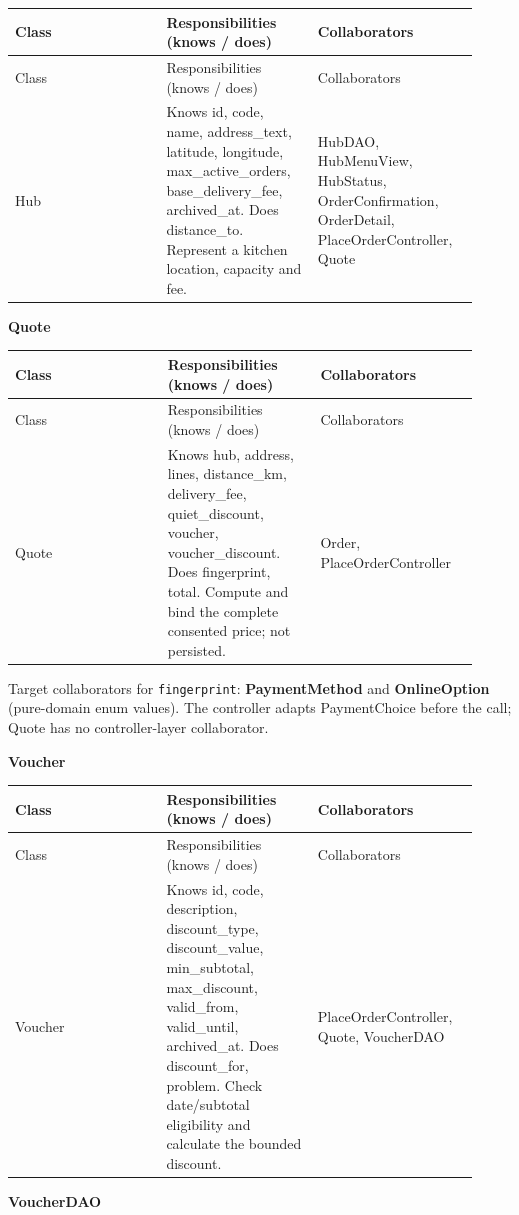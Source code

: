 \begin{longtable}{>{\raggedright\arraybackslash}p{0.3067\linewidth}>{\raggedright\arraybackslash}p{0.3067\linewidth}>{\raggedright\arraybackslash}p{0.3067\linewidth}}
Class & Responsibilities (knows / does) & Collaborators \\
\hline\endfirsthead
Class & Responsibilities (knows / does) & Collaborators \\
\hline\endhead
Hub & Knows id, code, name, address\_text, latitude, longitude, max\_active\_orders, base\_delivery\_fee, archived\_at. Does distance\_to. Represent a kitchen location, capacity and fee. & HubDAO, HubMenuView, HubStatus, OrderConfirmation, OrderDetail, PlaceOrderController, Quote \\
\end{longtable}
\textbf{Quote}

\begin{longtable}{>{\raggedright\arraybackslash}p{0.3067\linewidth}>{\raggedright\arraybackslash}p{0.3067\linewidth}>{\raggedright\arraybackslash}p{0.3067\linewidth}}
Class & Responsibilities (knows / does) & Collaborators \\
\hline\endfirsthead
Class & Responsibilities (knows / does) & Collaborators \\
\hline\endhead
Quote & Knows hub, address, lines, distance\_km, delivery\_fee, quiet\_discount, voucher, voucher\_discount. Does fingerprint, total. Compute and bind the complete consented price; not persisted. & Order, PlaceOrderController \\
\end{longtable}
Target collaborators for \texttt{fingerprint}: \textbf{PaymentMethod} and \textbf{OnlineOption} (pure-domain enum values). The controller adapts PaymentChoice before the call; Quote has no controller-layer collaborator.

\textbf{Voucher}

\begin{longtable}{>{\raggedright\arraybackslash}p{0.3067\linewidth}>{\raggedright\arraybackslash}p{0.3067\linewidth}>{\raggedright\arraybackslash}p{0.3067\linewidth}}
Class & Responsibilities (knows / does) & Collaborators \\
\hline\endfirsthead
Class & Responsibilities (knows / does) & Collaborators \\
\hline\endhead
Voucher & Knows id, code, description, discount\_type, discount\_value, min\_subtotal, max\_discount, valid\_from, valid\_until, archived\_at. Does discount\_for, problem. Check date/subtotal eligibility and calculate the bounded discount. & PlaceOrderController, Quote, VoucherDAO \\
\end{longtable}
\textbf{VoucherDAO}

